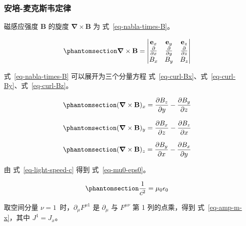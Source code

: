 \documentclass[
  chinese,
  a4paper,
  UTF8,
  12pt,
  oneside,
  openany]{ctexbook}
\theoremstyle{plain}
\theoremstyle{plain}
\theoremstyle{plain}
\theoremstyle{definition}
\theoremstyle{plain}
\theoremstyle{plain}
\theoremstyle{remark}
\begin{document}
\subsubsection{安培-麦克斯韦定律}\label{ux5b89ux57f9-ux9ea6ux514bux65afux97e6ux5b9aux5f8b}

磁感应强度 \(\mathbf{B}\) 的旋度
\(\boldsymbol{\nabla} \times \mathbf{B}\) 为 式~\ref{eq-nabla-times-B}。

\begin{equation}\protect\phantomsection\label{eq-nabla-times-B}{
\boldsymbol{\nabla} \times \mathbf{B} =
\begin{vmatrix}
\mathbf{e}_x & \mathbf{e}_y & \mathbf{e}_z \\
\frac{\partial}{\partial x} & \frac{\partial}{\partial y} & \frac{\partial}{\partial z} \\
B_x & B_y & B_z
\end{vmatrix}
}\end{equation}

式~\ref{eq-nabla-times-B} 可以展开为三个分量方程
式~\ref{eq-curl-Bx}、式~\ref{eq-curl-By}、式~\ref{eq-curl-Bz}。

\begin{equation}\protect\phantomsection\label{eq-curl-Bx}{
(\boldsymbol{\nabla} \times \mathbf{B})_x = \frac{\partial B_z}{\partial y} - \frac{\partial B_y}{\partial z}
}\end{equation}

\begin{equation}\protect\phantomsection\label{eq-curl-By}{
(\boldsymbol{\nabla} \times \mathbf{B})_y = \frac{\partial B_x}{\partial z} - \frac{\partial B_z}{\partial x}
}\end{equation}

\begin{equation}\protect\phantomsection\label{eq-curl-Bz}{
(\boldsymbol{\nabla} \times \mathbf{B})_z = \frac{\partial B_y}{\partial x} - \frac{\partial B_x}{\partial y}
}\end{equation}

由 式~\ref{eq-light-speed-c} 得到 式~\ref{eq-mu0-eps0}。

\begin{equation}\protect\phantomsection\label{eq-mu0-eps0}{
\frac{1}{c^{2}} = \mu_{0}\epsilon_{0}
}\end{equation}

取空间分量 \(\nu = 1\)~时，\(\partial_{\mu}F^{\mu 1}\) 是
\(\partial_{\mu}\) 与 \(F^{\mu\nu}\) 第 1 列的点乘，得到
式~\ref{eq-amp-m-x}，其中 \(J^{1} = J_{x}\)。
\end{document}
